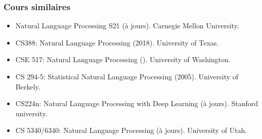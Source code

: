 \documentclass{beamer}
\begin{document}
\begin{frame}
	\frametitle{Cours similaires}
	
	\begin{itemize}
		
		\item Natural Language Processing S21 (à jours).
		Carnegie Mellon University. 
		
		\item CS388: Natural Language Processing (2018). 
		University of Texas. 
		
		\item CSE 517: Natural Language Processing ().
		University of Washington.
		
		\item CS 294-5: Statistical Natural Language Processing (2005). 
		University of Berkely. 
		
		\item CS224n: Natural Language Processing with Deep Learning (à jours).
		Stanford university.
		
		\item CS 5340/6340: Natural Language Processing (à jours). 
		University of Utah.
		
	\end{itemize}
	
\end{frame}
\end{document}
